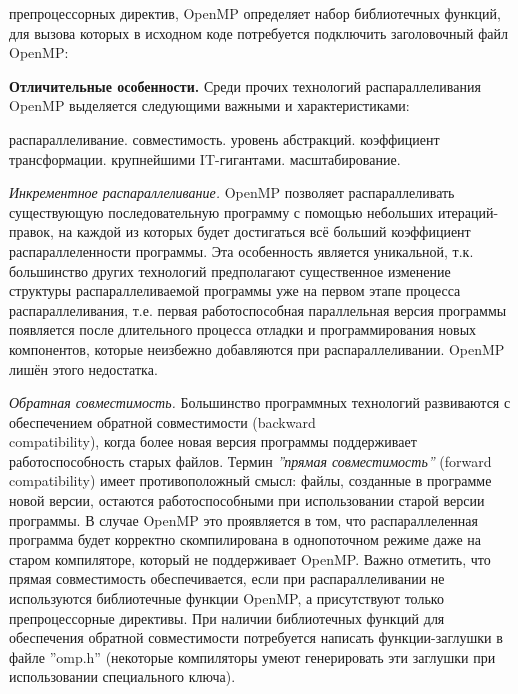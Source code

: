 {\begin{table}[H]
\begin{center}
		\end{center}
	\end{table}
	 препроцессорных директив, OpenMP определяет набор библиотечных функций, для вызова которых в исходном коде потребуется подключить заголовочный файл OpenMP:
	\begin{figure}[H]
		
	\end{figure}
	\par\textbf{Отличительные особенности.} Среди прочих технологий распараллеливания OpenMP выделяется следующими важными и характеристиками:
	\begin{itemize}
		 распараллеливание.
		 совместимость.
		 уровень абстракций.
		 коэффициент трансформации.
		 крупнейшими  IT-гигантами. 
		 масштабирование.
	\end{itemize}
	\par\textit{Инкрементное распараллеливание.}  OpenMP позволяет распараллеливать существующую последовательную программу с помощью небольших итераций-правок, на каждой из которых будет достигаться всё больший коэффициент распараллеленности программы. Эта особенность является уникальной, т.к. большинство других технологий предполагают существенное изменение структуры распараллеливаемой программы уже на первом этапе процесса распараллеливания, т.е. первая работоспособная параллельная версия программы появляется после длительного процесса отладки и программирования новых компонентов, которые неизбежно добавляются при распараллеливании. OpenMP лишён этого недостатка.
	\par\textit{Обратная совместимость.} Большинство программных технологий развиваются с обеспечением обратной совместимости (backward \\compatibility), когда более новая версия программы поддерживает работоспособность старых файлов. Термин \textit{''прямая совместимость''} (forward compatibility) имеет противоположный смысл: файлы, созданные в программе новой версии, остаются работоспособными при использовании старой версии программы. В случае OpenMP это проявляется в том, что распараллеленная программа будет корректно скомпилирована в однопоточном режиме даже на старом компиляторе, который не поддерживает OpenMP. Важно отметить, что прямая совместимость обеспечивается, если при распараллеливании не используются библиотечные функции OpenMP, а присутствуют только препроцессорные директивы. При наличии библиотечных функций для обеспечения обратной совместимости потребуется написать функции-заглушки в файле ''omp.h'' (некоторые компиляторы умеют генерировать эти заглушки при использовании специального ключа).
}
